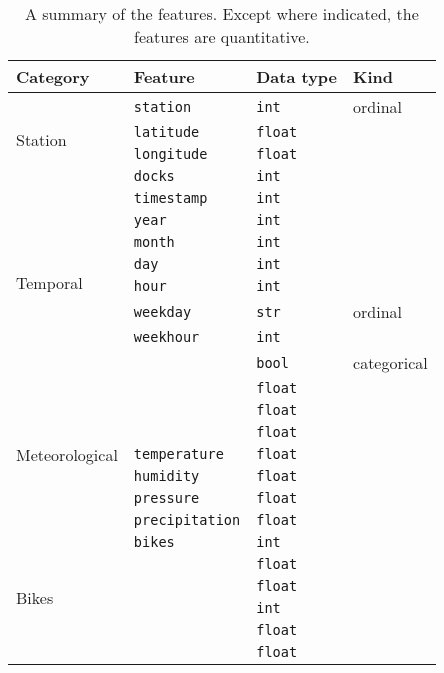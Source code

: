 
\begin{table}
  \newcommand{\tablefeaturesrow}[4]{#1 & #2 & #3 & #4 \\}
  \centering
  \begin{tabular}{llll}
    \toprule
    \tablefeaturesrow{Category}{Feature}{Data type}{Kind}
    \midrule
    \tablefeaturesrow{\multirow{4}{*}{Station}}{\texttt{station}}{\texttt{int}}{ordinal}
    \tablefeaturesrow{}{\texttt{latitude}}{\texttt{float}}{}
    \tablefeaturesrow{}{\texttt{longitude}}{\texttt{float}}{}
    \tablefeaturesrow{}{\texttt{docks}}{\texttt{int}}{}
    \midrule
    \tablefeaturesrow{\multirow{8}{*}{Temporal}}{\texttt{timestamp}}{\texttt{int}}{}
    \tablefeaturesrow{}{\texttt{year}}{\texttt{int}}{}
    \tablefeaturesrow{}{\texttt{month}}{\texttt{int}}{}
    \tablefeaturesrow{}{\texttt{day}}{\texttt{int}}{}
    \tablefeaturesrow{}{\texttt{hour}}{\texttt{int}}{}
    \tablefeaturesrow{}{\texttt{weekday}}{\texttt{str}}{ordinal}
    \tablefeaturesrow{}{\texttt{weekhour}}{\texttt{int}}{}
    \tablefeaturesrow{}{\texttt{\isholiday}}{\texttt{bool}}{categorical}
    \midrule
    \tablefeaturesrow{\multirow{7}{*}{Meteorological}}{\texttt{\windspeedmax}}{\texttt{float}}{}
    \tablefeaturesrow{}{\texttt{\windspeedavg}}{\texttt{float}}{}
    \tablefeaturesrow{}{\texttt{\winddirection}}{\texttt{float}}{}
    \tablefeaturesrow{}{\texttt{temperature}}{\texttt{float}}{}
    \tablefeaturesrow{}{\texttt{humidity}}{\texttt{float}}{}
    \tablefeaturesrow{}{\texttt{pressure}}{\texttt{float}}{}
    \tablefeaturesrow{}{\texttt{precipitation}}{\texttt{float}}{}
    \midrule
    \tablefeaturesrow{\multirow{6}{*}{Bikes}}{\texttt{bikes}}{\texttt{int}}{}
    \tablefeaturesrow{}{\texttt{\bikesavgfull}}{\texttt{float}}{}
    \tablefeaturesrow{}{\texttt{\bikesavgshort}}{\texttt{float}}{}
    \tablefeaturesrow{}{\texttt{\bikesh}}{\texttt{int}}{}
    \tablefeaturesrow{}{\texttt{\bikeshdiffavgfull}}{\texttt{float}}{}
    \tablefeaturesrow{}{\texttt{\bikeshdiffavgshort}}{\texttt{float}}{}
    \bottomrule
  \end{tabular}
  \caption{A summary of the features.
    Except where indicated, the features are quantitative.
  }
  \label{tab:features}
\end{table}

